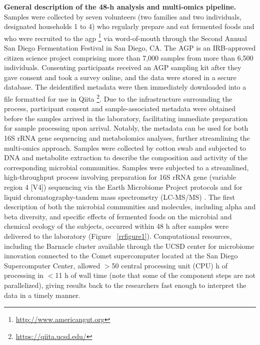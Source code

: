 \textbf{General description of the 48-h analysis and multi-omics pipeline.} Samples
were collected by seven volunteers (two families and two individuals,
designated households 1 to 4) who regularly prepare and eat fermented foods and who
were recruited to the \gls{agp} \footnote{\url{http://www.americangut.org}}
via word-of-mouth through the Second Annual San Diego Fermentation Festival in San Diego, CA.
The AGP is an IRB-approved citizen science project comprising more than 7,000 samples
from more than 6,500 individuals. Consenting participants received an AGP sampling kit after
they gave consent and took a survey online, and the data were stored in a secure
database. The deidentified metadata were then immediately downloaded into a file
formatted for use in Qiita \footnote{\url{https://qiita.ucsd.edu/}}. Due to the
infrastructure surrounding the process, participant consent and sample-associated
metadata were obtained before the samples arrived in the laboratory, facilitating
immediate preparation for sample processing upon arrival. Notably, the metadata
can be used for both 16S rRNA gene sequencing and metabolomics analyses, further
streamlining the multi-omics approach. Samples were collected by cotton swab and
subjected to DNA and metabolite extraction to describe the composition and activity
of the corresponding microbial communities. Samples were subjected to a streamlined,
high-throughput process involving preparation for 16S rRNA gene (variable region 4 [V4])
sequencing via the Earth Microbiome Project protocols \cite{Caporaso2012,Knight2012}
and for liquid chromatography-tandem mass spectrometry (LC-MS/MS) \cite{Bouslimani2015}.
The first description of both the microbial communities and molecules, including alpha
and beta diversity, and specific effects of fermented foods on the microbial and
chemical ecology of the subjects, occurred within 48 h after samples were delivered
to the laboratory (Figure ~\ref{rrfigure1}). Computational resources, including the
Barnacle cluster available through the UCSD center for microbiome innovation connected
to the Comet supercomputer located at the San Diego Supercomputer Center, allowed $>$50
central processing unit (CPU) h of processing in $<$11 h of wall time (note that some of
the component steps are not parallelized), giving results back to the researchers fast
enough to interpret the data in a timely manner.

